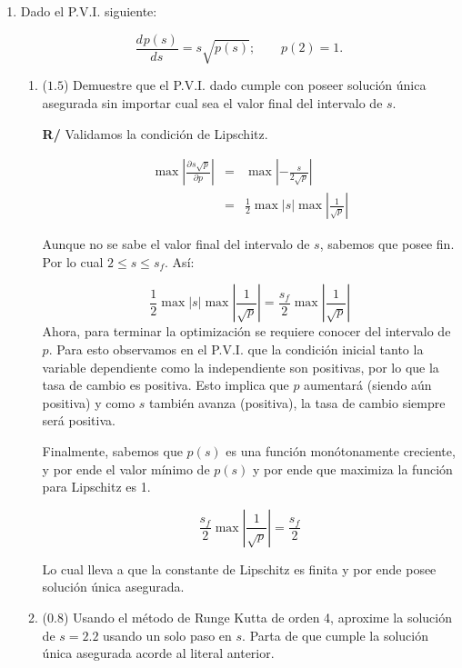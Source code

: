 \documentclass[12pt]{article}
\newcommand{\diff}[3]{\frac{d^{#3} #1}{d#2^{#3}}}
\newcommand{\pdiff}[3]{\frac{\partial^{#3} #1}{\partial#2^{#3}}}
\begin{document}
\vspace{-.5cm}
  \begin{enumerate}[leftmargin=*,widest=9]

    \item Dado el P.V.I. siguiente:

    \[
      \diff{p(s)}{s}{} = s\sqrt{p(s)};\qquad
      p(2) = 1.
    \]

    \begin{enumerate}[label=\alph*]
    \item (\(1.5\)) Demuestre que el P.V.I. dado cumple con poseer solución única asegurada sin importar cual sea el valor final del intervalo de \(s\).

    \textbf{R/} Validamos la condición de Lipschitz.

    \begin{eqnarray*}
\max \left\vert \pdiff{s\sqrt{p}}{p}{} \right\vert &= &\max \left\vert -\frac{s}{2\sqrt{p}}\right\vert\\
& = & \frac{1}{2}\max \vert s\vert \max \left\vert \frac{1}{\sqrt{p}} \right\vert
    \end{eqnarray*}

    Aunque no se sabe el valor final del intervalo de \(s\), sabemos que posee fin. Por lo cual \(2 \leq s \leq s_f\). Así:

    \[
\frac{1}{2}\max \vert s\vert \max \left\vert \frac{1}{\sqrt{p}} \right\vert = \frac{s_f}{2}\max\left\vert \frac{1}{\sqrt{p}} \right\vert
    \]
Ahora, para terminar la optimización se requiere conocer del intervalo de \(p\). Para esto observamos en el P.V.I. que la condición inicial tanto la variable dependiente como la independiente son positivas, por lo que la tasa de cambio es positiva. Esto implica que \(p\) aumentará (siendo aún positiva) y como \(s\) también avanza (positiva), la tasa de cambio siempre será positiva.

Finalmente, sabemos que \(p(s)\) es una función monótonamente creciente, y por ende el valor mínimo de \(p(s)\) y por ende que maximiza la función para Lipschitz es 1.

\[
\frac{s_f}{2}\max\left\vert \frac{1}{\sqrt{p}} \right\vert = \frac{s_f}{2}
\]

Lo cual lleva a que la constante de Lipschitz es finita y por ende posee solución única asegurada.

    \item (\(0.8\)) Usando el método de Runge Kutta de orden 4, aproxime la solución de \(s=2.2\) usando un solo paso en \(s\). Parta de que cumple la solución única asegurada acorde al literal anterior.


\end{enumerate}
\end{enumerate}
\end{document}
